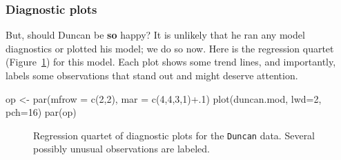 \documentclass[
  letterpaper,
  10pt,
  krantz2]{krantz}
\makeatletter
\newenvironment{Shaded}{\begin{snugshade}}{\end{snugshade}}
\newcommand{\AttributeTok}[1]{\textcolor[rgb]{0.40,0.45,0.13}{#1}}
\newcommand{\DecValTok}[1]{\textcolor[rgb]{0.68,0.00,0.00}{#1}}
\newcommand{\FunctionTok}[1]{\textcolor[rgb]{0.28,0.35,0.67}{#1}}
\newcommand{\NormalTok}[1]{\textcolor[rgb]{0.00,0.23,0.31}{#1}}
\newcommand{\OtherTok}[1]{\textcolor[rgb]{0.00,0.23,0.31}{#1}}
\newcommand{\SpecialCharTok}[1]{\textcolor[rgb]{0.37,0.37,0.37}{#1}}
\newenvironment{kframe}{%
  \medskip{}
  \setlength{\fboxsep}{.8em}
  \def\at@end@of@kframe{}%
  \ifinner\ifhmode%
  \def\at@end@of@kframe{\end{minipage}}%
  \begin{minipage}{\columnwidth}%
  \fi\fi%
  \def\FrameCommand##1{\hskip\@totalleftmargin \hskip-\fboxsep
  \colorbox{shadecolor}{##1}\hskip-\fboxsep
      \hskip-\linewidth \hskip-\@totalleftmargin \hskip\columnwidth}%
  \MakeFramed {\advance\hsize-\width
    \@totalleftmargin\z@ \linewidth\hsize
    \@setminipage}}%
{\par\unskip\endMakeFramed%
  \at@end@of@kframe}
\renewenvironment{Shaded}{\begin{kframe}}{\end{kframe}}
\makeatother
\begin{document}
\subsubsection{Diagnostic plots}\label{diagnostic-plots-1}

But, should Duncan be \textbf{so} happy? It is unlikely that he ran any
model diagnostics or plotted his model; we do so now. Here is the
regression quartet (Figure~\ref{fig-duncan-plot-model}) for this model.
Each plot shows some trend lines, and importantly, labels some
observations that stand out and might deserve attention.

\begin{Shaded}
\begin{Highlighting}[]
\NormalTok{op }\OtherTok{\textless{}{-}} \FunctionTok{par}\NormalTok{(}\AttributeTok{mfrow =} \FunctionTok{c}\NormalTok{(}\DecValTok{2}\NormalTok{,}\DecValTok{2}\NormalTok{), }
          \AttributeTok{mar =} \FunctionTok{c}\NormalTok{(}\DecValTok{4}\NormalTok{,}\DecValTok{4}\NormalTok{,}\DecValTok{3}\NormalTok{,}\DecValTok{1}\NormalTok{)}\SpecialCharTok{+}\NormalTok{.}\DecValTok{1}\NormalTok{)}
\FunctionTok{plot}\NormalTok{(duncan.mod, }\AttributeTok{lwd=}\DecValTok{2}\NormalTok{, }\AttributeTok{pch=}\DecValTok{16}\NormalTok{)}
\FunctionTok{par}\NormalTok{(op)}
\end{Highlighting}
\end{Shaded}

\begin{figure}[H]


\caption{\label{fig-duncan-plot-model}Regression quartet of diagnostic
plots for the \texttt{Duncan} data. Several possibly unusual
observations are labeled.}

\end{figure}%
\end{document}
